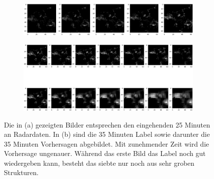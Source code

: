 \begin{figure}[]
	\centering
	\begin{subfigure}[]{\linewidth} 
		\centering
		\includegraphics[width=\linewidth]{pics/dt2.png}
		\caption[]{}\label{fa}
	\end{subfigure}
	
	\begin{subfigure}[]{\linewidth} 
		\centering
		\includegraphics[width=\linewidth]{pics/t2.png}
		\caption[]{}\label{fb}
	\end{subfigure}
	
	\caption[Validierungsdaten und Label sowie Vorhersage 1]{Die in (a) gezeigten Bilder entsprechen den eingehenden 25 Minuten an Radardaten. In (b) sind die 35 Minuten Label sowie darunter die 35 Minuten Vorhersagen abgebildet. Mit zunehmender Zeit wird die Vorhersage ungenauer. Während das erste Bild das Label noch gut wiedergeben kann, besteht das siebte nur noch aus sehr groben Strukturen.}
	\label{vieleBilder1}
\end{figure}

